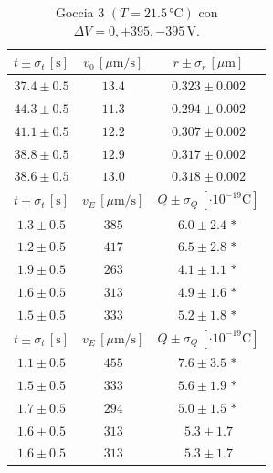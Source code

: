 \documentclass[]{article}
\begin{document}
    \begin{table}[H]
        \centering
        \begin{tabular}{||c|c|c||}
            \hline
            $t \pm \sigma_t \, \left[\text{s}\right]$ & $v_0 \, \left[\mu\text{m/s}\right]$ & $r \pm \sigma_r \, \left[\mu\text{m}\right]$ \\\hline
            \hline
            $37.4 \pm 0.5$ & $13.4$ & $0.323 \pm 0.002$ \\\hline
            $44.3 \pm 0.5$ & $11.3$ & $0.294 \pm 0.002$ \\\hline
            $41.1 \pm 0.5$ & $12.2$ & $0.307 \pm 0.002$ \\\hline
            $38.8 \pm 0.5$ & $12.9$ & $0.317 \pm 0.002$ \\\hline
            $38.6 \pm 0.5$ & $13.0$ & $0.318 \pm 0.002$ \\\hline
            \hline
            $t \pm \sigma_t \, \left[\text{s}\right]$ & $v_E \, \left[\mu\text{m/s}\right]$ & $Q \pm \sigma_Q \, \left[\cdot 10^{-19} \text{C}\right]$ \\\hline
            \hline
            $1.3 \pm 0.5$ & $385$ & $6.0 \pm 2.4\,\ast$ \\\hline
            $1.2 \pm 0.5$ & $417$ & $6.5 \pm 2.8\,\ast$ \\\hline
            $1.9 \pm 0.5$ & $263$ & $4.1 \pm 1.1\,\ast$ \\\hline
            $1.6 \pm 0.5$ & $313$ & $4.9 \pm 1.6\,\ast$ \\\hline
            $1.5 \pm 0.5$ & $333$ & $5.2 \pm 1.8\,\ast$ \\\hline
            \hline
            $t \pm \sigma_t \, \left[\text{s}\right]$ & $v_E \, \left[\mu\text{m/s}\right]$ & $Q \pm \sigma_Q \, \left[\cdot 10^{-19} \text{C}\right]$ \\\hline
            \hline
            $1.1 \pm 0.5$ & $455$ & $7.6 \pm 3.5\,\ast$ \\\hline
            $1.5 \pm 0.5$ & $333$ & $5.6 \pm 1.9\,\ast$ \\\hline
            $1.7 \pm 0.5$ & $294$ & $5.0 \pm 1.5\,\ast$ \\\hline
            $1.6 \pm 0.5$ & $313$ & $5.3 \pm 1.7$ \\\hline
            $1.6 \pm 0.5$ & $313$ & $5.3 \pm 1.7$ \\\hline
        \end{tabular}
        \caption{Goccia 3 $\left(T = 21.5\, \text{°C}\right)$ con $\Delta V = 0,+395,-395 \,\text{V}$.}
        \label{goccia-3}
    \end{table}
\end{document}
